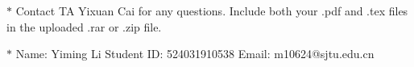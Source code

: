 \documentclass[12pt,a4paper]{article}
\theoremstyle{definition}
\begin{document}
\noindent

\noindent{}
\begin{center}
\footnotesize{\color{red}$*$ Contact TA Yixuan Cai for any questions. Include both your .pdf and .tex files in the uploaded .rar or .zip file.}

\footnotesize{\color{blue}$*$ Name: Yiming Li  \quad Student ID: 524031910538 \quad Email: m10624@sjtu.edu.cn}
\end{center}
\end{document}
